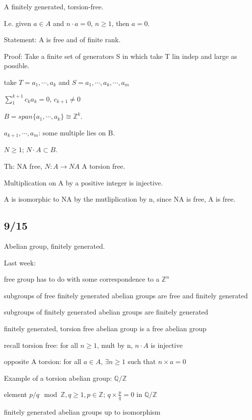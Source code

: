 \documentclass[12pt]{article}
\begin{document}
\noindent
A finitely generated, torsion-free.

I.e. given $a \in A$ and $n \cdot a = 0$, $n \geq 1$, then $a = 0$.

Statement: A is free and of finite rank.

\noindent
Proof: Take a finite set of generators S in which take T lin indep and large as possible.

take $T = a_1, \cdots, a_k$ and $S = a_1, \cdots, a_k, \cdots, a_m$

$\sum_{1}^{k + 1} c_ka_k = 0$, $c_{k+1} \neq 0$

$B = span\{a_1, \cdots, a_k\} \cong \mathds{Z}^k$.

$a_{k + 1}, \cdots,a_m$: some multiple lies on B.

$N \geq 1$; $N \cdot A \subset B$.

Th: NA free, $N: A \to NA$ A torsion free.

Multiplication on A by a positive integer is injective.

A is isomorphic to NA by the mutliplication by n, since NA is free, A is free.

\subsection{9/15}

\noindent
Abelian group, finitely generated.

\noindent
Last week:

free group has to do with some correspondence to a $\mathds{Z}^n$

subgroups of free finitely generated abelian groups are free and finitely generated

subgroups of finitely generated abelian groups are finitely generated

finitely generated, torsion free abelian group is a free abelian group

recall torsion free: for all $n \geq 1$, mult by n, $n \cdot A$ is injective

opposite A torsion: for all $a \in A$, $\exists n \geq 1$ such that $n \times a = 0$

\noindent
Example of a torsion abelian group: $\mathds{Q}/\mathds{Z}$

element $p/q \mod{\mathds{Z}}, q \geq 1, p \in \mathds{Z}$; $q \times \frac{p}{q} = 0$ in $\mathds{Q}/\mathds{Z}$

\noindent
finitely generated abelian groups up to isomorphism
\end{document}
